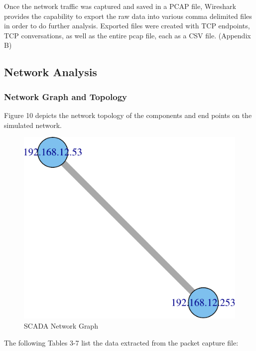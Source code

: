 \documentclass[11pt,]{article}
\begin{document}
Once the network traffic was captured and saved in a PCAP file,
Wireshark provides the capability to export the raw data into various
comma delimited files in order to do further analysis. Exported files
were created with TCP endpoints, TCP conversations, as well as the
entire pcap file, each as a CSV file. (Appendix B)

\subsection{Network Analysis}\label{network-analysis}

\subsubsection{Network Graph and
Topology}\label{network-graph-and-topology}

Figure 10 depicts the network topology of the components and end points
on the simulated network.

\begin{figure}[h]

{\centering \includegraphics{thesis_files/figure-latex/warning-1} 

}

\caption{SCADA Network Graph}\label{fig:warning}
\end{figure}

\newpage

The following Tables 3-7 list the data extracted from the packet capture
file:
\end{document}

